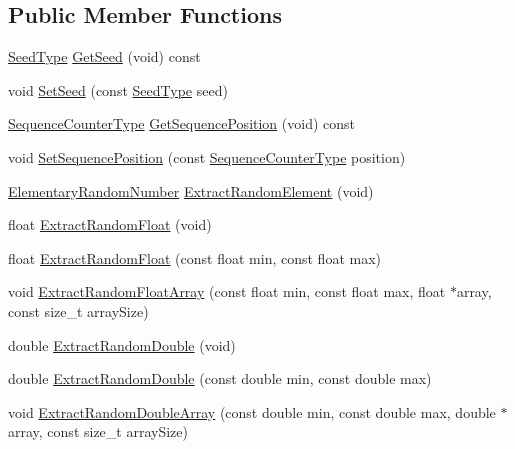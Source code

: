 \subsection*{Public Member Functions}
\begin{DoxyCompactItemize}
\item 
\hyperlink{classcmn_random_sequence_a7b97009536ce38559fa5fb86a9eea16d}{Seed\+Type} \hyperlink{classcmn_random_sequence_a57fe316f0876245c29b59433e38b1c3f}{Get\+Seed} (void) const 
\item 
void \hyperlink{classcmn_random_sequence_a6a2a9b155aabad3f03084dd0118b7184}{Set\+Seed} (const \hyperlink{classcmn_random_sequence_a7b97009536ce38559fa5fb86a9eea16d}{Seed\+Type} seed)
\item 
\hyperlink{classcmn_random_sequence_ac3befd667513146020ef266429e205b0}{Sequence\+Counter\+Type} \hyperlink{classcmn_random_sequence_a929d0a120c7d031c0387098c2d2d6c4a}{Get\+Sequence\+Position} (void) const 
\item 
void \hyperlink{classcmn_random_sequence_aa3dacc3e54ded2e0b55e78e460f1bd0d}{Set\+Sequence\+Position} (const \hyperlink{classcmn_random_sequence_ac3befd667513146020ef266429e205b0}{Sequence\+Counter\+Type} position)
\item 
\hyperlink{classcmn_random_sequence_a4728645d25009df6b70fd0db6340f92f}{Elementary\+Random\+Number} \hyperlink{classcmn_random_sequence_ae86a1796c5a5fac599d61eb4a97e584d}{Extract\+Random\+Element} (void)
\item 
float \hyperlink{classcmn_random_sequence_a83458b2db657ac64588a2ccab6fea256}{Extract\+Random\+Float} (void)
\item 
float \hyperlink{classcmn_random_sequence_ac1c18ecbee3d9c31513167cd00b1619d}{Extract\+Random\+Float} (const float min, const float max)
\item 
void \hyperlink{classcmn_random_sequence_a0bfe5e8b2dfeb93e78eda34f3b445a55}{Extract\+Random\+Float\+Array} (const float min, const float max, float $\ast$array, const size\+\_\+t array\+Size)
\item 
double \hyperlink{classcmn_random_sequence_a86a8975706bba0f41e0d0a50327ba28d}{Extract\+Random\+Double} (void)
\item 
double \hyperlink{classcmn_random_sequence_a4a62c7f71d9bab73b58282c50ef5403d}{Extract\+Random\+Double} (const double min, const double max)
\item 
void \hyperlink{classcmn_random_sequence_a4135de38e09760cc8f3b901ac9580b50}{Extract\+Random\+Double\+Array} (const double min, const double max, double $\ast$array, const size\+\_\+t array\+Size)

\end{DoxyCompactItemize}

